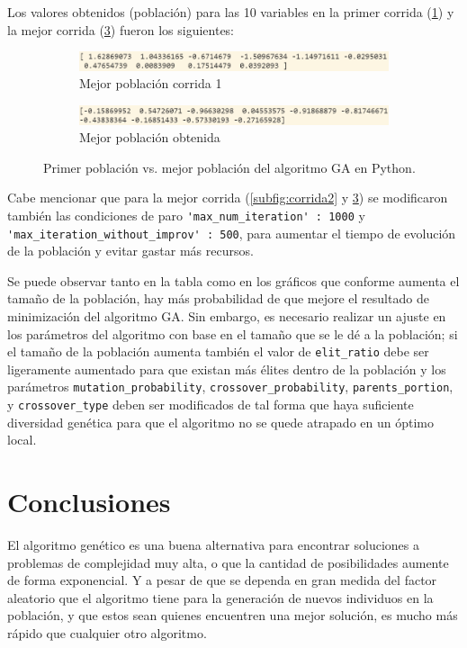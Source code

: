 \documentclass[a4paper, 12pt]{article}
\begin{document}
Los valores obtenidos (población) para las 10 variables en la primer corrida (\ref{subfig:corrida1_pob}) y la mejor corrida (\ref{subfig:corrida2_pob}) fueron los siguientes:

\begin{figure}[!ht]
    \centering
    \begin{subfigure}[b]{0.48\textwidth}
        \centering
        \includegraphics[width=\textwidth]{img/corrida_1pob.png}
        \caption{Mejor población corrida 1}
        \label{subfig:corrida1_pob}
    \end{subfigure}
    \hfill
    \begin{subfigure}[b]{0.48\textwidth}
        \centering
        \includegraphics[width=\textwidth]{img/corrida_4pob.png}
        \caption{Mejor población obtenida}
        \label{subfig:corrida2_pob}
    \end{subfigure}
    \caption{Primer población vs. mejor población del algoritmo GA en Python.}
\end{figure}

Cabe mencionar que para la mejor corrida (\ref{subfig:corrida2} y \ref{subfig:corrida2_pob}) se modificaron también las condiciones de paro \lstinline{'max_num_iteration' : 1000} y \lstinline{'max_iteration_without_improv' : 500}, para aumentar el tiempo de evolución de la población y evitar gastar más recursos.

Se puede observar tanto en la tabla como en los gráficos que conforme aumenta el tamaño de la población, hay más probabilidad de que mejore el resultado de minimización del algoritmo GA. Sin embargo, es necesario realizar un ajuste en los parámetros del algoritmo con base en el tamaño que se le dé a la población; si el tamaño de la población aumenta también el valor de \lstinline{elit_ratio} debe ser ligeramente aumentado para que existan más élites dentro de la población y los parámetros \lstinline{mutation_probability}, \lstinline{crossover_probability}, \lstinline{parents_portion}, y \lstinline{crossover_type} deben ser modificados de tal forma que haya suficiente diversidad genética para que el algoritmo no se quede atrapado en un óptimo local.

\section{Conclusiones}
El algoritmo genético es una buena alternativa para encontrar soluciones a problemas de complejidad muy alta, o que la cantidad de posibilidades aumente de forma exponencial. Y a pesar de que se dependa en gran medida del factor aleatorio que el algoritmo tiene para la generación de nuevos individuos en la población, y que estos sean quienes encuentren una mejor solución, es mucho más rápido que cualquier otro algoritmo.



\nocite{*}
\end{document}
